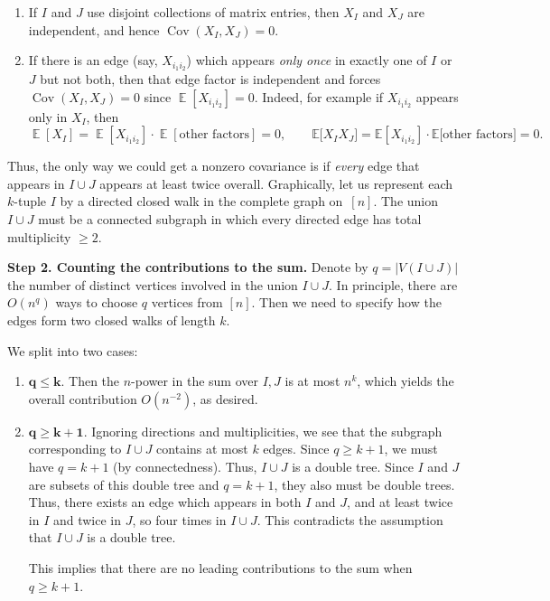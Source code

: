 \documentclass[letterpaper,11pt,oneside,reqno]{book}
\numberwithin{equation}{chapter}  %
\theoremstyle{definition}
\begin{document}
\begin{enumerate}
\item
If \(I\) and \(J\) use disjoint collections of matrix entries, then \(X_I\) and \(X_J\) are independent, and hence $\operatorname{\mathrm{Cov}}(X_I,X_J)=0$.

\item
	If there is an edge (say, \(X_{i_1 i_2}\)) which appears
	\emph{only once}
	in exactly one of \(I\) or \(J\) but not both, then that
	edge factor is independent and forces
	$\operatorname{\mathrm{Cov}}(X_I,X_J)=0$ since
	$\operatorname{\mathbb{E}}[X_{i_1 i_2}]=0$.
Indeed, for example if \(X_{i_1 i_2}\) appears only in \(X_I\), then
\[
	\operatorname{\mathbb{E}}\left[ X_I \right]
	=
	\operatorname{\mathbb{E}}\left[ X_{i_1 i_2} \right]
	\cdot
	\operatorname{\mathbb{E}}\left[ \text{other factors} \right]
	=0,
	\qquad
	\mathbb{E}\bigl[X_I X_J\bigr]
	=
	\mathbb{E}[X_{i_1 i_2}]
	\cdot
	\mathbb{E}\bigl[\text{other factors}\bigr]
	=0.
\]

\end{enumerate}

\noindent
Thus, the only way we could get a nonzero covariance is if \emph{every} edge that appears in \(I\cup J\) appears at least twice overall.
Graphically, let us represent each \(k\)-tuple \(I\) by a directed closed walk in the complete graph on~\([n]\).  The union \(I\cup J\) must be a connected subgraph in which every directed edge has total multiplicity \(\ge2\).

\medskip

\noindent
\textbf{Step 2. Counting the contributions to the sum.}
Denote by \(q=\lvert V(I\cup J)\rvert\) the number of
distinct vertices involved in the union \(I\cup J\).
In principle, there are $O(n^q)$ ways to choose $q$ vertices from $[n]$.
Then we need to specify how the edges form two closed walks of length $k$.

We split into two cases:
\begin{enumerate}
\item
\(\boldsymbol{q\le k.}\)
Then the $n$-power in the sum over $I,J$ is at most
$n^k$, which yields the overall contribution
$O(n^{-2})$, as desired.

\item
\(\boldsymbol{q\ge k+1.}\)
Ignoring directions and multiplicities,
we see that the subgraph corresponding to $I\cup J$
contains at most \(k\) edges. Since \(q \ge k + 1\), we must have \(q = k + 1\)
(by connectedness). Thus,
\(I \cup J\) is a double tree.
Since $I$ and $J$ are subsets of this double tree and $q=k+1$,
they also must be double trees.
Thus, there exists an edge which appears in both $I$ and $J$, and
at least twice in $I$ and twice in $J$, so four times in $I\cup J$.
This contradicts the assumption that $I\cup J$ is a double tree.

This implies that
there are no leading contributions to the sum when \(q\ge k+1\).
\end{enumerate}
\end{document}
